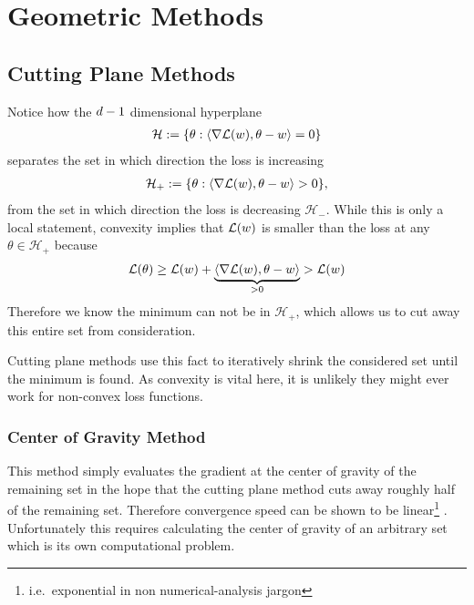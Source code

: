 \section{Geometric Methods}\label{sec: geometric methods}

\subsection{Cutting Plane Methods}

Notice how the \(d-1\) dimensional hyperplane
\begin{align*}
	\mathcal{H}
	:= \{\theta : \langle \nabla\mathcal{L}(w), \theta - w \rangle = 0\}
\end{align*}
separates the set in which direction the loss is increasing
\begin{align*}
	\mathcal{H}_+
	:= \{\theta : \langle \nabla\mathcal{L}(w), \theta - w \rangle > 0\},
\end{align*}
from the set in which direction the loss is decreasing \(\mathcal{H}_-\). While
this is only a local statement, convexity implies that \(\mathcal{L}(w)\) is
smaller than the loss at any \(\theta\in\mathcal{H}_+\) because
\begin{align*}
	\mathcal{L}(\theta)
	\ge \mathcal{L}(w) + \underbrace{\langle \nabla\mathcal{L}(w), \theta -w\rangle}_{>0}
	> \mathcal{L}(w)
\end{align*}
Therefore we know the minimum can not be in \(\mathcal{H}_+\), which allows us
to cut away this entire set from consideration.

Cutting plane methods use this fact to iteratively shrink the considered set
until the minimum is found. As convexity is vital here, it is unlikely they
might ever work for non-convex loss functions.

\subsubsection{Center of Gravity Method}

This method simply evaluates the gradient at the center of gravity of the
remaining set in the hope that the cutting plane method cuts away roughly half
of the remaining set. Therefore convergence speed can be shown to be
linear\footnote{i.e.\ exponential in non numerical-analysis jargon} 
\parencite[e.g.][Theorem 2.1]{bubeckConvexOptimizationAlgorithms2015}.
Unfortunately this requires calculating the center of gravity of an arbitrary
set which is its own computational problem. 

